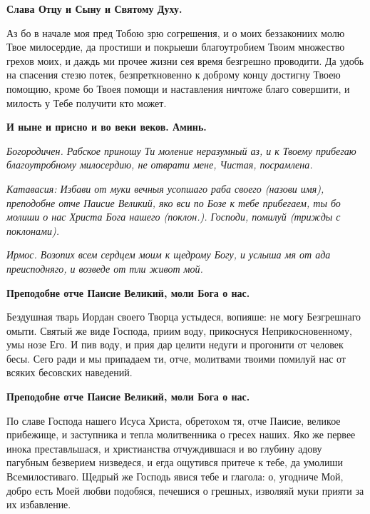 \bfseries Слава Отцу и Сыну и Святому Духу.\normalfont{}




Аз бо в начале моя пред Тобою зрю согрешения, и о моих беззакониих молю Твое милосердие, да простиши и покрыеши благоутробием Твоим множество грехов моих, и даждь ми прочее жизни сея время безгрешно проводити. Да удобь на спасения стезю потек, безпреткновенно к доброму концу достигну Твоею помощию, кроме бо Твоея помощи и наставления ничтоже благо совершити, и милость у Тебе получити кто может. 




\bfseries И ныне и присно и во веки веков. Аминь.\normalfont{}




\itshape Богородичен.\normalfont{} Рабское приношу Ти моление неразумный аз, и к Твоему прибегаю благоутробному милосердию, не отврати мене, Чистая, посрамлена. 




\itshape Катавасия:\normalfont{} Избави от муки вечныя усопшаго раба своего (\itshape назови имя\normalfont{}), преподобне отче Паисие Великий, яко вси по Бозе к тебе прибегаем, ты бо молиши о нас Христа Бога нашего (\itshape поклон.\normalfont{}). Господи, помилуй (\itshape трижды с поклонами\normalfont{}). 








\itshape Ирмос.\normalfont{} Возопих всем сердцем моим к щедрому Богу, и услыша мя от ада преисподняго, и возведе от тли живот мой. 




\bfseries Преподобне отче Паисие Великий, моли Бога о нас.\normalfont{}




Бездушная тварь Иордан своего Творца устыдеся, вопияше: не могу Безгрешнаго омыти. Святый же виде Господа, приим воду, прикоснуся Неприкосновенному, умы нозе Его. И пив воду, и прия дар целити недуги и прогонити от человек бесы. Сего ради и мы припадаем ти, отче, молитвами твоими помилуй нас от всяких бесовских наведений. 




\bfseries Преподобне отче Паисие Великий, моли Бога о нас.\normalfont{}




По славе Господа нашего Исуса Христа, обретохом тя, отче Паисие, великое прибежище, и заступника и тепла молитвенника о гресех наших. Яко же первее инока преставльшася, и христианства отчуждившася и во глубину адову пагубным безверием низведеся, и егда ощутився притече к тебе, да умолиши Всемилостиваго. Щедрый же Господь явися тебе и глагола: о, угодниче Мой, добро есть Моей любви подобяся, печешися о грешных, изволяяй муки прияти за их избавление. 




